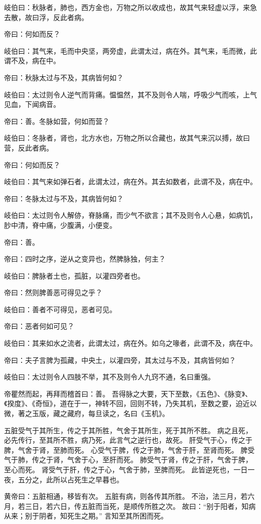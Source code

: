 \documentclass{article}%
\begin{document}
岐伯曰：秋脉者，肺也，西方金也，万物之所以收成也，故其气来轻虚以浮，来急去散，故曰浮，反此者病。

帝曰：何如而反？

岐伯曰：其气来，毛而中央坚，两旁虚，此谓太过，病在外。其气来，毛而微，此谓不及，病在中。

帝曰：秋脉太过与不及，其病皆何如？

岐伯曰：太过则令人逆气而背痛。愠愠然，其不及则令人喘，呼吸少气而咳，上气见血，下闻病音。

帝曰：善。冬脉如营，何如而营？

岐伯曰：冬脉者，肾也，北方水也，万物之所以合藏也，故其气来沉以搏，故曰营，反此者病。

帝曰：何如而反？

岐伯曰：其气来如弹石者，此谓太过，病在外。其去如数者，此谓不及，病在中。

帝曰：冬脉太过与不及，其病皆何如？

岐伯曰：太过则令人解㑊，脊脉痛，而少气不欲言；其不及则令人心悬，如病饥，䏚中清，脊中痛，少腹满，小便变。

帝曰：善。

帝曰：四时之序，逆从之变异也，然脾脉独，何主？

岐伯曰：脾脉者土也，孤脏，以灌四旁者也。

帝曰：然则脾善恶可得见之乎？

岐伯曰：善者不可得见，恶者可见。

帝曰：恶者何如可见？

岐伯曰：其来如水之流者，此谓太过，病在外。如乌之喙者，此谓不及，病在中。

帝曰：夫子言脾为孤藏，中央土，以灌四旁，其太过与不及，其病皆何如？

岐伯曰：太过则令人四肢不举，其不及则令人九窍不通，名曰重强。

帝瞿然而起，再拜而稽首曰：善。
吾得脉之大要，天下至数，《五色》、《脉变》、《揆度》、《奇恒》，道在于一，神转不回，回则不转，乃失其机，至数之要，迫近以微，著之玉版，藏之藏府，每旦读之，名曰《玉机》。

五脏受气于其所生，传之于其所胜，气舍于其所生，死于其所不胜。
病之且死，必先传行，至其所不胜，病乃死，此言气之逆行也，故死。
肝受气于心，传之于脾，气舍于肾，至肺而死。
心受气于脾，传之于肺，气舍于肝，至肾而死。
脾受气于肺，传之于肾，气舍于心，至肝而死。
肺受气于肾，传之于肝，气舍于脾，至心而死。
肾受气于肝，传之于心，气舍于肺，至脾而死。
此皆逆死也，一日一夜，五分之，此所以占死生之早暮也。

黄帝曰：五脏相通，移皆有次。
五脏有病，则各传其所胜。
不治，法三月，若六月，若三日，若六日，传五脏而当死，是顺传所胜之次。
故曰：“别于阳者，知病从来；别于阴者，知死生之期。”
言知至其所困而死。
\end{document}
